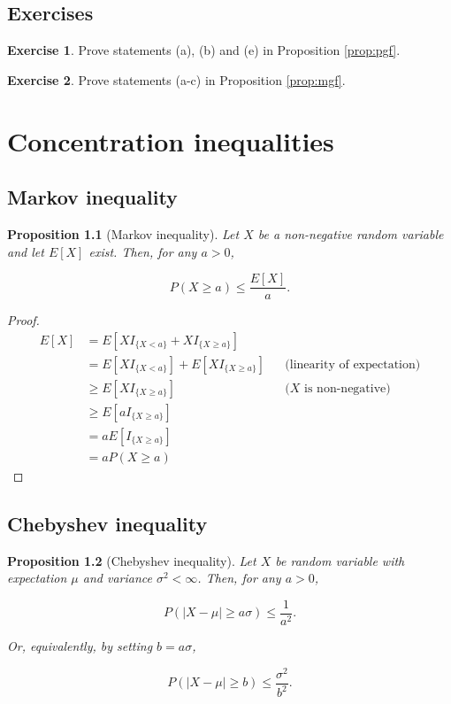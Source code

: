 \documentclass{book}
\theoremstyle{plain}%
\newtheorem{proposition}{Proposition}[section]
\theoremstyle{definition}
\newtheorem{exercise}{Exercise}[chapter]
\begin{document}
\section*{Exercises}

\begin{exercise}
Prove statements (a), (b) and (e) in Proposition \ref{prop:pgf}.
\end{exercise}


\begin{exercise}
Prove statements (a-c) in Proposition \ref{prop:mgf}.
\end{exercise}


\chapter{Concentration inequalities}

\section{Markov inequality}

\begin{proposition}[Markov inequality]
Let $X$ be a non-negative random variable and let $E[X]$ exist. Then, for any $a > 0$,

$$P(X \geq a) \leq \frac{E[X]}{a}.$$
\end{proposition}

\begin{proof}

\begin{align*}
    E[X] &= E[XI_{\{X < a\}} + XI_{\{X \geq a\}}]\\
    &= E[XI_{\{X < a\}}] + E[XI_{\{X \geq a\}}] && \text{(linearity of expectation)}\\
    &\geq E[XI_{\{X \geq a\}}] && \text{($X$ is non-negative)}\\
    &\geq E[aI_{\{X \geq a\}}] && \text{}\\
    &= aE[I_{\{X \geq a\}}] && \text{}\\
    &= aP(X \geq a) && \text{}
\end{align*}

\end{proof}

\section{Chebyshev inequality}

\begin{proposition}[Chebyshev inequality]
Let $X$ be random variable with expectation $\mu$ and variance $\sigma^2 < \infty$. Then, for any $a > 0$,

$$P(|X - \mu| \geq a\sigma) \leq \frac{1}{a^2}.$$

Or, equivalently, by setting $b = a\sigma$,

$$P(|X - \mu| \geq b) \leq \frac{\sigma^2}{b^2}.$$
\end{proposition}
\end{document}
